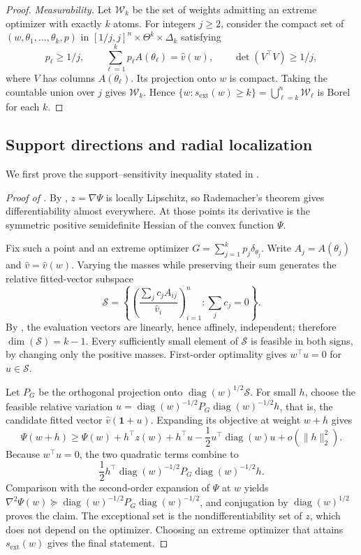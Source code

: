 \documentclass[11pt]{article}
\theoremstyle{definition}
\theoremstyle{remark}
\DeclareMathOperator{\diag}{diag}
\newcommand{\one}{\bm 1}
\newcommand{\norm}[1]{\lVert #1\rVert}
\newcommand{\vhat}{\widehat v}
\newcommand{\sext}{s_{\mathrm{ext}}}
\begin{document}
\begin{proof}
\emph{Measurability.}  Let $\mathcal W_k$ be the set of weights admitting an
extreme optimizer with exactly $k$ atoms.  For integers $j\ge2$, consider the
compact set of $(w,\theta_1,\ldots,\theta_k,p)$ in
$[1/j,j]^n\times\Theta^k\times\Delta_k$ satisfying
\[
 p_\ell\ge1/j,\qquad
 \sum_{\ell=1}^kp_\ell A(\theta_\ell)=\vhat(w),
 \qquad \det(V^\top V)\ge1/j,
\]
where $V$ has columns $A(\theta_\ell)$.  Its projection onto $w$ is compact.
Taking the countable union over $j$ gives $\mathcal W_k$.  Hence
$\{w:\sext(w)\ge k\}=\bigcup_{\ell=k}^n\mathcal W_\ell$ is Borel for each
$k$.
\end{proof}

\subsection{Support directions and radial localization}
\label{app:effective-local}

We first prove the support--sensitivity inequality stated in
.

\begin{proof}[Proof of ]
By , $z=\nabla\Psi$ is locally Lipschitz, so
Rademacher's theorem gives differentiability almost everywhere.  At those
points its derivative is the symmetric positive semidefinite Hessian of the
convex function $\Psi$.

Fix such a point and an extreme optimizer
$G=\sum_{j=1}^kp_j\delta_{\theta_j}$.  Write $A_j=A(\theta_j)$ and
$\widehat v=\vhat(w)$.  Varying the masses while preserving their sum
generates the relative fitted-vector subspace
\[
 \mathcal S=\left\{
 \left(\frac{\sum_jc_jA_{ij}}{\widehat v_i}\right)_{i=1}^n:
 \sum_jc_j=0\right\}.
\]
By , the evaluation vectors are linearly, hence affinely,
independent; therefore $\dim(\mathcal S)=k-1$.  Every sufficiently small
element of $\mathcal S$ is feasible in both signs, by changing only the
positive masses.  First-order optimality gives $w^\top u=0$ for
$u\in\mathcal S$.

Let $P_G$ be the orthogonal projection onto $\diag(w)^{1/2}\mathcal S$.  For
small $h$, choose the feasible relative variation
$u=\diag(w)^{-1/2}P_G\diag(w)^{-1/2}h$, that is, the candidate fitted vector
$\widehat v(\one+u)$.  Expanding its objective at weight $w+h$ gives
\[
 \Psi(w+h)\ge\Psi(w)+h^\top z(w)
 +h^\top u-\frac12u^\top\diag(w)u+o(\norm{h}_2^2).
\]
Because $w^\top u=0$, the two quadratic terms combine to
\[
 \frac12h^\top\diag(w)^{-1/2}P_G\diag(w)^{-1/2}h.
\]
Comparison with the second-order expansion of $\Psi$ at $w$ yields
$\nabla^2\Psi(w)\succeq\diag(w)^{-1/2}P_G\diag(w)^{-1/2}$, and conjugation by
$\diag(w)^{1/2}$ proves the claim.  The exceptional set is the
nondifferentiability set of $z$, which does not depend on the optimizer.
Choosing an extreme optimizer that attains $\sext(w)$ gives the final
statement.
\end{proof}
\end{document}

